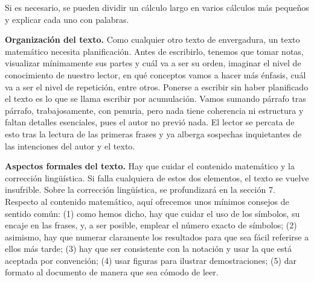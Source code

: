 Si es necesario, se pueden dividir un cálculo largo en varios cálculos más pequeños y explicar cada uno con palabras.

\hspace{5mm}\textbf{Organización del texto.}
Como cualquier otro texto de envergadura, un texto matemático necesita planificación. Antes de escribirlo, tenemos que tomar notas, visualizar mínimamente sus partes y cuál va a ser su orden, imaginar el nivel de conocimiento de nuestro lector, en qué conceptos vamos a hacer más énfasis, cuál va a ser el nivel de repetición, entre otros. Ponerse a escribir sin haber planificado el texto es lo que se llama escribir por acumulación. Vamos sumando párrafo tras párrafo, trabajosamente, con penuria, pero nada tiene coherencia ni estructura y faltan detalles esenciales, pues el autor no previó nada. El lector se percata de esto tras la lectura de las primeras frases y ya alberga sospechas inquietantes de las intenciones del autor y el texto.

\hspace{5mm}\textbf{Aspectos formales del texto.}
Hay que cuidar el contenido matemático y la corrección lingüística. Si falla cualquiera de estos dos elementos, el texto se vuelve insufrible. Sobre la corrección lingüística, se profundizará en la sección 7. Respecto al contenido matemático, aquí ofrecemos unos mínimos consejos de sentido común: (1) como hemos dicho, hay que cuidar el uso de los símbolos, su encaje en las frases, y, a ser posible, emplear el número exacto de símbolos; (2) asimismo, hay que numerar claramente los resultados para que sea fácil referirse a ellos más tarde; (3) hay que ser consistente con la notación y usar la que está aceptada por convención; (4) usar figuras para ilustrar demostraciones; (5) dar formato al documento de manera que sea cómodo de leer.


